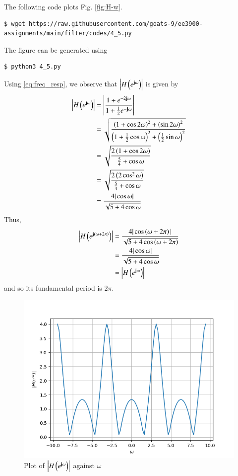 \documentclass[journal,12pt,twocolumn]{IEEEtran}
\renewcommand\thesection{\arabic{section}}
\begin{document}
\begin{enumerate}[label=\thesection.\arabic*]
\solution The following code plots Fig. \eqref{fig:H-w}.
\begin{lstlisting}
$ wget https://raw.githubusercontent.com/goats-9/ee3900-assignments/main/filter/codes/4_5.py
\end{lstlisting}
The figure can be generated using
\begin{lstlisting}
$ python3 4_5.py
\end{lstlisting}
Using \eqref{eq:freq_resp}, we observe that $\left|H\left(e^{\mathbf{j}\omega}\right)\right|$ is given by
\begin{align}
	\left|H\left(e^{\mathbf{j}\omega}\right)\right| &= \left|\frac{1 + e^{-2\mathbf{j}\omega}}{1 + \frac{1}{2}e^{-\mathbf{j}\omega}}\right| \\
									  &= \sqrt{\frac{\left(1 + \cos{2\omega}\right)^2 + \left(\sin{2\omega}\right)^2}{\left(1 + \frac{1}{2}\cos{\omega}\right)^2 + \left(\frac{1}{2}\sin{\omega}\right)^2}}\\
									  &= \sqrt{\frac{2\left(1 + \cos{2\omega}\right)}{\frac{5}{4} + \cos{\omega}}} \\
									  &= \sqrt{\frac{2\left(2\cos^2{\omega}\right)}{\frac{5}{4} + \cos{\omega}}} \\
									  &= \frac{4|\cos{\omega}|}{\sqrt{5 + 4\cos{\omega}}}
\end{align}
Thus,
\begin{align}
	\left|H\left(e^{\mathbf{j}\left(\omega + 2\pi\right)}\right)\right| &= \frac{4|\cos\left(\omega + 2\pi\right)|}{\sqrt{5 + 4\cos\left(\omega + 2\pi\right)}} \\
											   &= \frac{4|\cos{\omega}|}{\sqrt{5 + 4\cos{\omega}}} \\
											   &= \left|H\left(e^{\mathbf{j}\omega}\right)\right|	
\end{align}
and so its fundamental period is $2\pi$.
\begin{figure}[!ht]
	\centering
	\includegraphics[width=\columnwidth]{Figures/Q4/4__5.png}
	\caption{Plot of $\left|H\left(e^{\mathbf{j}\omega}\right)\right|$ against $\omega$}
	\label{fig:H-w}
\end{figure}


\end{enumerate}
\end{document}
